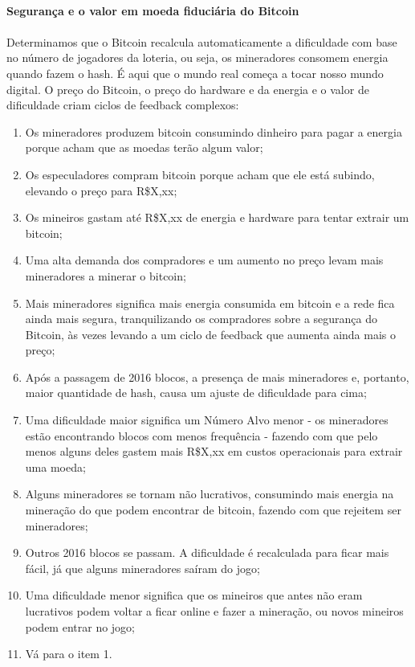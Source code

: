 \paragraph{Segurança e o valor em moeda fiduciária do Bitcoin}
\paragraph{}

Determinamos que o Bitcoin recalcula automaticamente a dificuldade com base no número de jogadores da loteria, ou seja, os mineradores consomem energia quando fazem o hash. É aqui que o mundo real começa a tocar nosso mundo digital. O preço do Bitcoin, o preço do hardware e da energia e o valor de dificuldade criam ciclos de feedback complexos:

\begin{enumerate}
\item Os mineradores produzem bitcoin consumindo dinheiro para pagar a energia porque acham que as moedas terão algum valor;
\item Os especuladores compram bitcoin porque acham que ele está subindo, elevando o preço para R\$X,xx;
\item Os mineiros gastam até R\$X,xx de energia e hardware para tentar extrair um bitcoin;
\item Uma alta demanda dos compradores e um aumento no preço levam mais mineradores a minerar o bitcoin;
\item Mais mineradores significa mais energia consumida em bitcoin e a rede fica ainda mais segura, tranquilizando os compradores sobre a segurança do Bitcoin, às vezes levando a um ciclo de feedback que aumenta ainda mais o preço;
\item Após a passagem de 2016 blocos, a presença de mais mineradores e, portanto, maior quantidade de hash, causa um ajuste de dificuldade para cima;
\item Uma dificuldade maior significa um Número Alvo menor - os mineradores estão encontrando blocos com menos frequência - fazendo com que pelo menos alguns deles gastem mais R\$X,xx em custos operacionais para extrair uma moeda;
\item Alguns mineradores se tornam não lucrativos, consumindo mais energia na mineração do que podem encontrar de bitcoin, fazendo com que rejeitem ser mineradores;
\item Outros 2016 blocos se passam. A dificuldade é recalculada para ficar mais fácil, já que alguns mineradores saíram do jogo;
\item Uma dificuldade menor significa que os mineiros que antes não eram lucrativos podem voltar a ficar online e fazer a mineração, ou novos mineiros podem entrar no jogo;
\item Vá para o item 1.
\end{enumerate}

